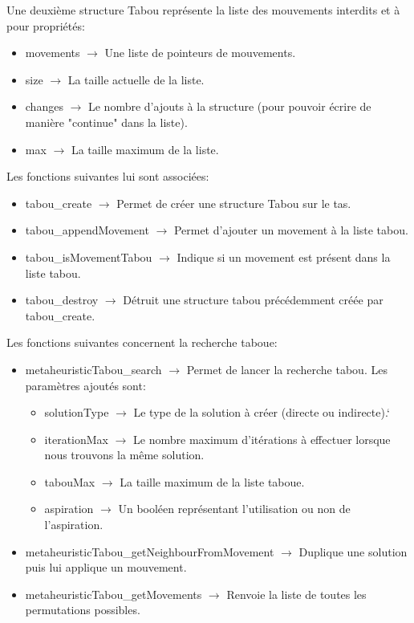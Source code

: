 \documentclass{EPUProjetPeiP}
\begin{document}
Une deuxième structure Tabou représente la liste des mouvements interdits et à pour propriétés:
\begin{itemize}
	\item movements $\longrightarrow$ Une liste de pointeurs de mouvements.
	\item size $\longrightarrow$ La taille actuelle de la liste.
	\item changes $\longrightarrow$ Le nombre d'ajouts à la structure (pour pouvoir écrire de manière "continue" dans la liste).
	\item max $\longrightarrow$ La taille maximum de la liste.\\
\end{itemize}

Les fonctions suivantes lui sont associées:
\begin{itemize}
	\item tabou\_create $\longrightarrow$ Permet de créer une structure Tabou sur le tas.
	\item tabou\_appendMovement $\longrightarrow$ Permet d'ajouter un movement à la liste tabou.
	\item tabou\_isMovementTabou $\longrightarrow$ Indique si un movement est présent dans la liste tabou.
	\item tabou\_destroy $\longrightarrow$ Détruit une structure tabou précédemment créée par tabou\_create.\\
\end{itemize}

Les fonctions suivantes concernent la recherche taboue:
\begin{itemize}
	\item metaheuristicTabou\_search $\longrightarrow$ Permet de lancer la recherche tabou. Les paramètres ajoutés sont:
	\begin{itemize}
		\item solutionType $\longrightarrow$ Le type de la solution à créer (directe ou indirecte).`
		\item iterationMax $\longrightarrow$ Le nombre maximum d'itérations à effectuer lorsque nous trouvons la même solution.
		\item tabouMax $\longrightarrow$ La taille maximum de la liste taboue.
		\item aspiration $\longrightarrow$ Un booléen représentant l'utilisation ou non de l'aspiration.
	\end{itemize}
	\item metaheuristicTabou\_getNeighbourFromMovement $\longrightarrow$ Duplique une solution puis lui applique un mouvement.
	\item metaheuristicTabou\_getMovements $\longrightarrow$ Renvoie la liste de toutes les permutations possibles.
\end{itemize}
\end{document}
